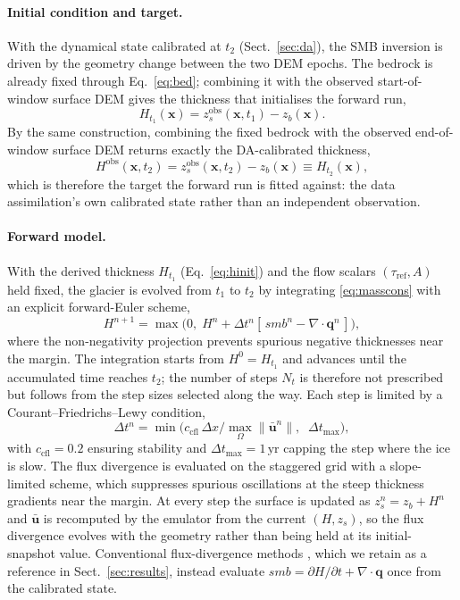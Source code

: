 \paragraph{Initial condition and target.}
With the dynamical state calibrated at $t_2$ (Sect.~\ref{sec:da}), the SMB inversion
is driven by the geometry change between the two DEM epochs. The bedrock is already
fixed through Eq.~\eqref{eq:bed}; combining it with the observed start-of-window
surface DEM gives the thickness that initialises the forward run,
\begin{equation}
  H_{t_1}(\mathbf{x}) = z_s^{\mathrm{obs}}(\mathbf{x}, t_1) - z_b(\mathbf{x}).
  \label{eq:hinit}
\end{equation}
By the same construction, combining the fixed bedrock with the observed
end-of-window surface DEM returns exactly the DA-calibrated thickness,
\begin{equation}
  H^{\mathrm{obs}}(\mathbf{x}, t_2) = z_s^{\mathrm{obs}}(\mathbf{x}, t_2) - z_b(\mathbf{x}) \equiv H_{t_2}(\mathbf{x}),
  \label{eq:hobs}
\end{equation}
which is therefore the target the forward run is fitted against: the data
assimilation's own calibrated state rather than an independent observation.
\paragraph{Forward model.}
With the derived thickness $H_{t_1}$ (Eq.~\ref{eq:hinit}) and the flow scalars
$(\tau_{\mathrm{ref}}, A)$ held fixed, the glacier is evolved from $t_1$ to $t_2$ by
integrating \eqref{eq:masscons} with an explicit forward-Euler scheme,
\begin{equation}
  H^{n+1} = \max\!\big(0,\; H^n + \Delta t^n [\,smb^n - \nabla\cdot\mathbf{q}^n\,]\big),
  \label{eq:euler}
\end{equation}
where the non-negativity projection prevents spurious negative thicknesses near the
margin. The integration starts from $H^0 = H_{t_1}$ and advances until the accumulated
time reaches $t_2$; the number of steps $N_t$ is therefore not prescribed but follows
from the step sizes selected along the way. Each step is limited by a
Courant--Friedrichs--Lewy condition,
\begin{equation}
  \Delta t^n = \min\!\Big(c_{\mathrm{cfl}}\,\Delta x \big/
  \max_\Omega\|\bar{\mathbf{u}}^n\|,\;\; \Delta t_{\max}\Big),
  \label{eq:cfl}
\end{equation}
with $c_{\mathrm{cfl}} = 0.2$ ensuring stability and
$\Delta t_{\max} = 1\,\mathrm{yr}$ capping the step where the ice is slow. The flux
divergence is evaluated on the staggered grid with a slope-limited scheme, which
suppresses spurious oscillations at the steep thickness gradients near the margin. At
every step the surface is updated as $z_s^n = z_b + H^n$ and $\bar{\mathbf{u}}$ is
recomputed by the emulator from the current $(H, z_s)$, so the flux divergence evolves
with the geometry rather than being held at its initial-snapshot value. Conventional
flux-divergence methods \citep{miles2021, kneib2024}, which we retain as a reference in
Sect.~\ref{sec:results}, instead evaluate $smb = \partial H/\partial t +
\nabla\cdot\mathbf{q}$ once from the calibrated state.

